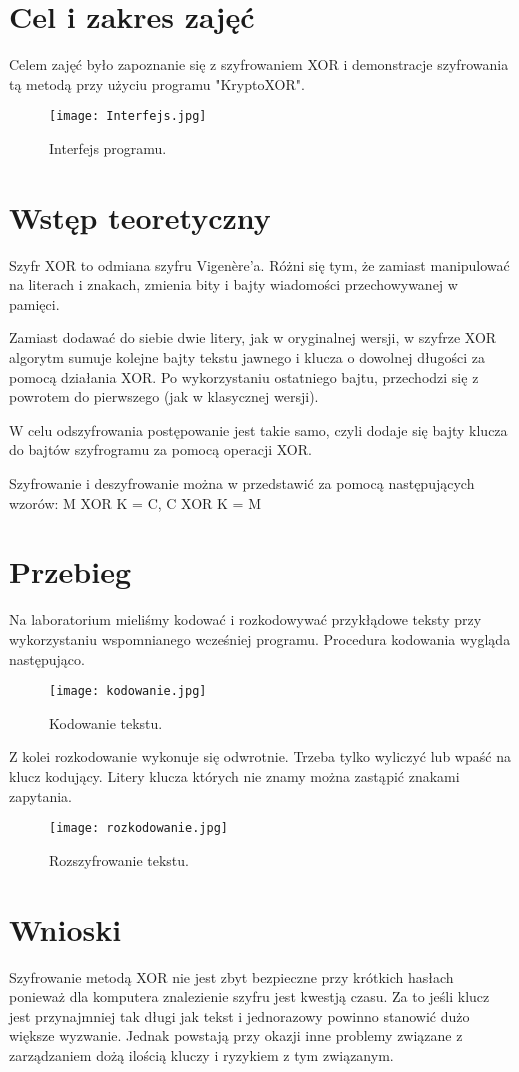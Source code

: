 \documentclass[a4paper,twoside,12pt]{mgr}
\begin{document}
\stronaTytulowa

\tableofcontents
\chapter{Cel i zakres zajęć}
Celem zajęć było zapoznanie się z szyfrowaniem XOR i demonstracje szyfrowania tą metodą przy użyciu programu "KryptoXOR".

\begin{figure}[H]
\centering
\texttt{[image: Interfejs.jpg]}
\caption{Interfejs programu.}%
\label{rys:etykieta}
\end{figure} 

\chapter{Wstęp teoretyczny}
Szyfr XOR to odmiana szyfru Vigenère'a. Różni się tym, że zamiast manipulować na literach i znakach, zmienia bity i bajty wiadomości przechowywanej w pamięci.

Zamiast dodawać do siebie dwie litery, jak w oryginalnej wersji, w szyfrze XOR algorytm sumuje kolejne bajty tekstu jawnego i klucza o dowolnej długości za pomocą działania XOR. Po wykorzystaniu ostatniego bajtu, przechodzi się z powrotem do pierwszego (jak w klasycznej wersji).

W celu odszyfrowania postępowanie jest takie samo, czyli dodaje się bajty klucza do bajtów szyfrogramu za pomocą operacji XOR.

Szyfrowanie i deszyfrowanie można w przedstawić za pomocą następujących wzorów:
    M XOR K = C,
    C XOR K = M

\chapter{Przebieg}
Na laboratorium mieliśmy kodować i rozkodowywać przykłądowe teksty przy wykorzystaniu wspomnianego wcześniej programu. Procedura kodowania wygląda następująco.

\begin{figure}[H]
\centering
\texttt{[image: kodowanie.jpg]}
\caption{Kodowanie tekstu.}%
\label{rys:etykieta}
\end{figure} 

Z kolei rozkodowanie wykonuje się odwrotnie. Trzeba tylko wyliczyć lub wpaść na klucz kodujący. Litery klucza których nie znamy można zastąpić znakami zapytania.

\begin{figure}[H]
\centering
\texttt{[image: rozkodowanie.jpg]}
\caption{Rozszyfrowanie tekstu.}%
\label{rys:etykieta}
\end{figure} 

\chapter{Wnioski}
Szyfrowanie metodą XOR nie jest zbyt bezpieczne przy krótkich hasłach ponieważ dla komputera znalezienie szyfru jest kwestją czasu. Za to jeśli klucz jest przynajmniej tak długi jak tekst i jednorazowy powinno stanowić dużo większe wyzwanie. Jednak powstają przy okazji inne problemy związane z zarządzaniem dożą ilością kluczy i ryzykiem z tym związanym.
\end{document}
